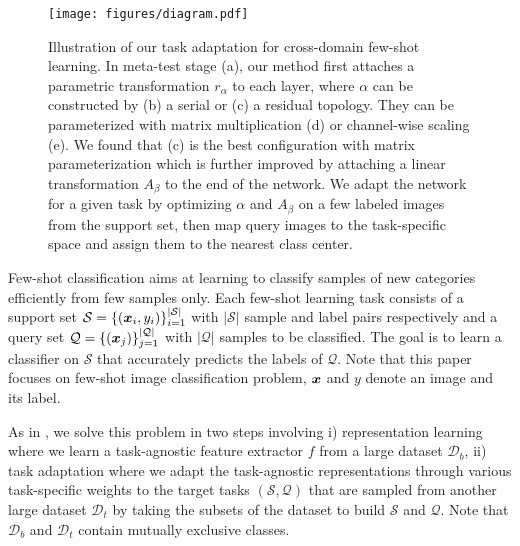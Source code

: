 
\begin{figure*}[t]
\texttt{[image: figures/diagram.pdf]}
\vspace{-0.35cm}
\caption{Illustration of our task adaptation for cross-domain few-shot learning. In meta-test stage (a), our method first attaches a parametric transformation $r_{\alpha}$ to each layer, where $\alpha$ can be constructed by (b) a serial or (c) a residual topology. They can be parameterized with matrix multiplication (d) or  channel-wise scaling (e).
We found that (c) is the best configuration with matrix parameterization which is further improved by attaching a linear transformation $A_{\beta}$ to the end of the network. We adapt the network for a given task by optimizing $\alpha$ and $A_{\beta}$ on a few labeled images from the support set, then map query images to the task-specific space and assign them to the nearest class center.}
\label{fig:framework}
\end{figure*}

Few-shot classification aims at learning to classify samples of new categories efficiently from few samples only. 
Each few-shot learning task consists of a support set $\mathcal{S}=\{(\bm{x}_i, y_i)\}_{i=1}^{\rvert \mathcal{S} \lvert}$ with $\rvert \mathcal{S} \lvert$ sample and label pairs respectively and a query set $\mathcal{Q}=\{(\bm{x}_j)\}_{j=1}^{\lvert \mathcal{Q} \rvert }$ with $\lvert \mathcal{Q} \rvert$ samples to be classified.
The goal is to learn a classifier on $\mathcal{S}$ that accurately predicts the labels of $\mathcal{Q}$.
Note that this paper focuses on few-shot image classification problem, \ie $\bm{x}$ and $y$ denote an image and its label.

As in \cite{dvornik2020selecting,liu2020universal,li2021universal}, we solve this problem in two steps involving i) representation learning where we learn a task-agnostic feature extractor $f$ from a large dataset $\mathcal{D}_b$, ii) task adaptation where we adapt the task-agnostic representations through various task-specific weights to the target tasks $(\mathcal{S},\mathcal{Q})$ that are sampled from another large dataset $\mathcal{D}_{t}$ by taking the subsets of the dataset to build $\mathcal{S}$ and $\mathcal{Q}$.
Note that $\mathcal{D}_{b}$ and $\mathcal{D}_{t}$ contain mutually exclusive classes.

